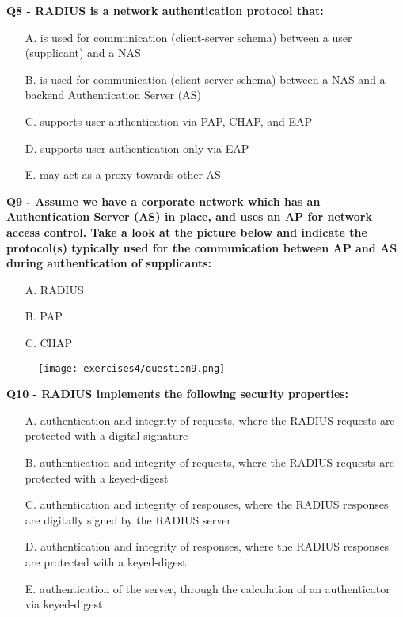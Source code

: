 \textbf{Q8 - RADIUS is a network authentication protocol that:}
\begin{itemize}
    \item[A.] is used for communication (client-server schema) between a user (supplicant) and a NAS
    \item[B.] is used for communication (client-server schema) between a NAS and a backend Authentication Server (AS)
    \item[C.] supports user authentication via PAP, CHAP, and EAP
    \item[D.] supports user authentication only via EAP
    \item[E.] may act as a proxy towards other AS
\end{itemize}

\textbf{Q9 - Assume we have a corporate network which has an Authentication Server (AS) in place, and uses an AP for network access control. Take a look at the picture below and indicate the protocol(s) typically used for the communication between AP and AS during authentication of supplicants:}
\begin{itemize}
    \item[A.] RADIUS
    \item[B.] PAP
    \item[C.] CHAP
\end{itemize}
\begin{figure}[h]
    \centering
    \texttt{[image: exercises4/question9.png]}
\end{figure}

\textbf{Q10 - RADIUS implements the following security properties:}
\begin{itemize}
    \item[A.] authentication and integrity of requests, where the RADIUS requests are protected with a digital signature
    \item[B.] authentication and integrity of requests, where the RADIUS requests are protected with a keyed-digest
    \item[C.] authentication and integrity of responses, where the RADIUS responses are digitally signed by the RADIUS server
    \item[D.] authentication and integrity of responses, where the RADIUS responses are protected with a keyed-digest
    \item[E.] authentication of the server, through the calculation of an authenticator via keyed-digest
\end{itemize}

